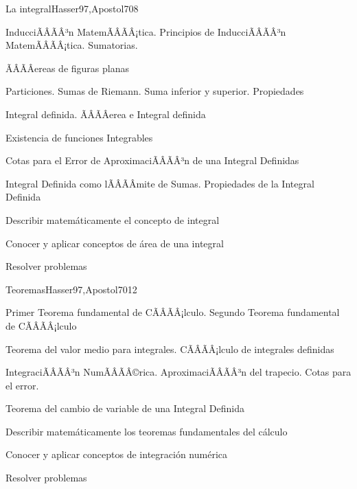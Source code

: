 \begin{sumilla}
\begin{unit}{La integral}{Hasser97,Apostol70}{8}
\begin{topicos}
	\item InducciÃÂÃÂ³n MatemÃÂÃÂ¡tica. Principios de InducciÃÂÃÂ³n MatemÃÂÃÂ¡tica. Sumatorias.
	\item ÃÂÃÂereas de figuras planas
	\item Particiones. Sumas de Riemann. Suma inferior y superior. Propiedades
	\item Integral definida. ÃÂÃÂerea e Integral definida
	\item Existencia de funciones Integrables
	\item Cotas para el Error de AproximaciÃÂÃÂ³n de una Integral Definidas
	\item Integral Definida como lÃÂÃÂ­mite de Sumas. Propiedades de la Integral Definida
\end{topicos}
\begin{objetivos}
	\item Describir matem\'aticamente el concepto de integral
	\item Conocer y aplicar conceptos de \'area de una integral
	\item Resolver problemas
\end{objetivos}
\end{unit}

\begin{unit}{Teoremas}{Hasser97,Apostol70}{12}
\begin{topicos}
      \item Primer Teorema fundamental de CÃÂÃÂ¡lculo. Segundo Teorema fundamental de CÃÂÃÂ¡lculo
      \item Teorema del valor medio para integrales. CÃÂÃÂ¡lculo de integrales definidas
      \item IntegraciÃÂÃÂ³n NumÃÂÃÂ©rica. AproximaciÃÂÃÂ³n del trapecio. Cotas para el error.
      \item Teorema del cambio de variable de una Integral Definida
\end{topicos}

   \begin{objetivos}
      \item Describir matem\'aticamente los teoremas fundamentales del c\'alculo
      \item Conocer y aplicar conceptos de integraci\'on num\'erica
	\item Resolver problemas
   \end{objetivos}
\end{unit}


\end{sumilla}
